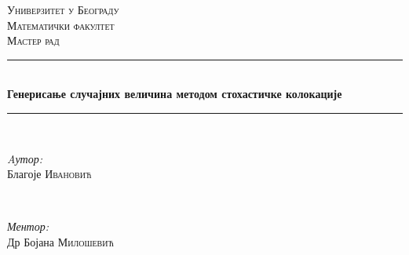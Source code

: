\begin{titlepage}

\newcommand{\HRule}{\rule{\linewidth}{0.5mm}} %

\center %
 

\textsc{\LARGE Универзитет у Београду}\\[1.5cm] %
\textsc{\Large Математички факултет}\\[0.5cm] %
\textsc{\large Мастер рад}\\[0.5cm] %


\HRule \\[0.4cm]
{ \huge \bfseries Генерисање случајних величина методом стохастичке колокације}\\[0.4cm] %
\HRule \\[1.5cm]
 

\begin{minipage}{0.45\textwidth}
\begin{flushleft} \large
\emph{Aутор:}\\
Благоје \textsc{Ивановић} %
\end{flushleft}
\end{minipage}
~
\begin{minipage}{0.45\textwidth}
\begin{flushright} \large
\emph{Ментор:} \\
Др Бојана \textsc{Милошевић} %
\end{flushright}
\end{minipage}\\[2cm]



\end{titlepage}
